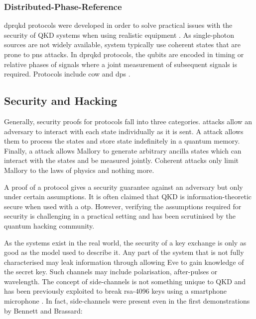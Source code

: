
\subsubsection{Distributed-Phase-Reference}

\Ac{dprqkd} protocols were developed in order to solve practical issues with the security of \ac{QKD} systems when using realistic equipment \cite{diamanti2016practical}. As single-photon sources are not widely available, system typically use coherent states that are prone to \ac{pns} attacks. In \ac{dprqkd} protocols, the qubits are encoded in timing or relative phases of signals where a joint measurement of subsequent signals is required. Protocols include \ac{cow} \cite{COW-QKD} and \ac{dps} \cite{DPS-QKD}.

\subsection{Security and Hacking}

Generally, security proofs for protocols fall into three categories.  attacks allow an adversary to interact with each state individually as it is sent. A  attack allows them to process the states and store state indefinitely in a quantum memory. Finally, a  attack allows Mallory to generate arbitrary ancilla states which can interact with the states and be measured jointly. Coherent attacks only limit Mallory to the laws of physics and nothing more.

A proof of a protocol gives a security guarantee against an adversary but only under certain assumptions. It is often claimed that \ac{QKD} is information-theoretic secure when used with a \ac{otp}. However, verifying the assumptions required for security is challenging in a practical setting and has been scrutinised by the quantum hacking community. 

As the systems exist in the real world, the security of a key exchange is only as good as the model used to describe it. Any part of the system that is not fully characterised may leak information through  allowing Eve to gain knowledge of the secret key. Such channels may include polarisation, after-pulses or wavelength. The concept of side-channels is not something unique to \ac{QKD} and has been previously exploited to break \ac{rsa}-4096 keys using a smartphone microphone \cite{Genkin2014RSA}. In fact, side-channels were present even in the first demonstrations by Bennett and Brassard:

